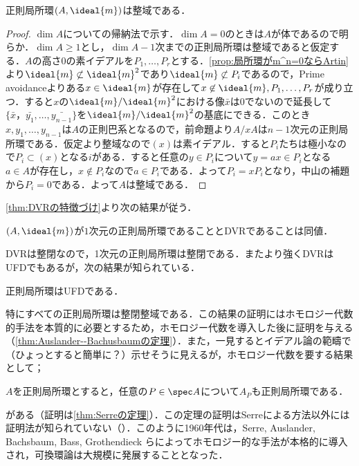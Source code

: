 \begin{thm}\label{thm:正則局所環は整域}
	正則局所環$(A,\ideal{m})$は整域である．
\end{thm}

\begin{proof}
	$\dim A$についての帰納法で示す．$\dim A=0$のときは$A$が体であるので明らか．$\dim A\geq 1$とし，$\dim A-1$次までの正則局所環は整域であると仮定する．$A$の高さ$0$の素イデアルを$P_1,\dots,P_r$とする．\ref{prop:局所環がm^n=0ならArtin}より$\ideal{m}\not\subset\ideal{m}^2$であり$\ideal{m}\not\subset P_i$であるので，Prime avoidanceよりある$x\in\ideal{m}$が存在して$x\not\in\ideal{m},P_1,\dots,P_r$が成り立つ．すると$x$の$\ideal{m}/\ideal{m}^2$における像$\bar{x}$は$0$でないので延長して$\{\bar{x}，\bar{y_1},\dots,\bar{y_{n-1}}\}$を$\ideal{m}/\ideal{m}^2$の基底にできる．このとき$x,y_1,\dots,y_{n-1}$は$A$の正則巴系となるので，前命題より$A/xA$は$n-1$次元の正則局所環である．仮定より整域なので$(x)$は素イデアル．すると$P_i$たちは極小なので$P_i\subset(x)$となる$i$がある．すると任意の$y\in P_i$について$y=ax\in P_i$となる$a\in A$が存在し，$x\not\in P_i$なので$a\in P_i$である．よって$P_i=xP_i$となり，中山の補題から$P_i=0$である．よって$A$は整域である．
\end{proof}

\ref{thm:DVRの特徴づけ}より次の結果が従う．

\begin{cor}
	$(A,\ideal{m})$が$1$次元の正則局所環であることとDVRであることは同値．
\end{cor}

DVRは整閉なので，1次元の正則局所環は整閉である．またより強くDVRはUFDでもあるが，次の結果が知られている．

\begin{thm}\label{prethm:Auslander-Bachusbaum}
	正則局所環はUFDである．
\end{thm}

特にすべての正則局所環は整閉整域である．この結果の証明にはホモロジー代数的手法を本質的に必要とするため，ホモロジー代数を導入した後に証明を与える（\ref{thm:Auslander--Bachusbaumの定理}）．また，一見するとイデアル論の範疇で（ひょっとすると簡単に？）示せそうに見えるが，ホモロジー代数を要する結果として；

\begin{thm}[Serreの定理]\label{prethm:Serre}
	$A$を正則局所環とすると，任意の$P\in\spec A$について$A_P$も正則局所環である．
\end{thm}
がある（証明は\ref{thm:Serreの定理}）．この定理の証明はSerreによる方法以外には証明法が知られていない（\cite{goto}）．このように1960年代は，Serre, Auslander, Bachsbaum, Bass, Grothendieck らによってホモロジー的な手法が本格的に導入され，可換環論は大規模に発展することとなった．

